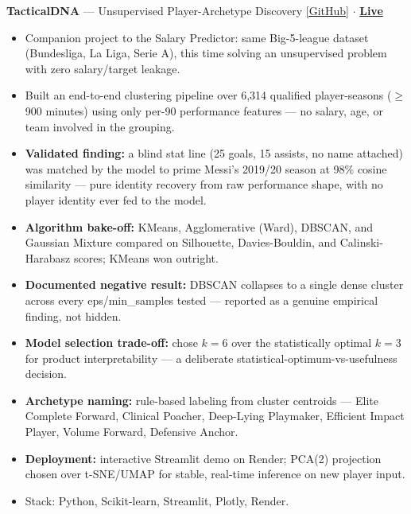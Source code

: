 \documentclass[11pt,a4paper]{article}
\begin{document}
\textbf{TacticalDNA} --- Unsupervised Player-Archetype Discovery \hfill \href{https://github.com/davronbek-malikov/tactical-dna}{[GitHub]} $\cdot$ {\large\textbf{\href{https://soccer-player-clustering.onrender.com}{Live}}}
\begin{itemize}
    \item Companion project to the Salary Predictor: same Big-5-league dataset (Bundesliga, La Liga,
Serie A), this time solving an unsupervised problem with zero salary/target leakage.
    \item Built an end-to-end clustering pipeline over 6,314 qualified player-seasons ($\geq$900 minutes)
using only per-90 performance features --- no salary, age, or team involved in the grouping.
    \item \textbf{Validated finding:} a blind stat line (25 goals, 15 assists, no name attached) was matched
by the model to prime Messi's 2019/20 season at 98\% cosine similarity --- pure identity recovery
from raw performance shape, with no player identity ever fed to the model.
    \item \textbf{Algorithm bake-off:} KMeans, Agglomerative (Ward), DBSCAN, and Gaussian Mixture
compared on Silhouette, Davies-Bouldin, and Calinski-Harabasz scores; KMeans won outright.
    \item \textbf{Documented negative result:} DBSCAN collapses to a single dense cluster across every
eps/min\_samples tested --- reported as a genuine empirical finding, not hidden.
    \item \textbf{Model selection trade-off:} chose $k=6$ over the statistically optimal $k=3$ for product
interpretability --- a deliberate statistical-optimum-vs-usefulness decision.
    \item \textbf{Archetype naming:} rule-based labeling from cluster centroids --- Elite Complete Forward,
Clinical Poacher, Deep-Lying Playmaker, Efficient Impact Player, Volume Forward, Defensive Anchor.
    \item \textbf{Deployment:} interactive Streamlit demo on Render; PCA(2) projection chosen over
t-SNE/UMAP for stable, real-time inference on new player input.
    \item Stack: Python, Scikit-learn, Streamlit, Plotly, Render.
\end{itemize}

\medskip
\end{document}

